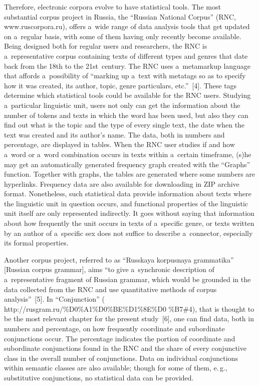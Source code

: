 \begin{multicols}{2}
  Therefore, electronic corpora evolve to have statistical tools. The most 
substantial corpus project in Russia, the ``Russian National Corpus'' (RNC, {\sf 
www.ruscorpora.ru}), offers a~wide range of data analysis tools that get updated on a~regular basis, with some of them having only recently become available. Being 
designed both for regular users and researchers, the RNC is a~representative corpus 
containing texts of different types and genres that date back from the 18th to the 
21st~century. The RNC uses a~metamarkup language that affords a~possibility of 
``marking up a~text with metatags so as to specify how it was created, its author, 
topic, genre particulars, etc.''~[4]. These tags determine which statistical tools 
could be available for the RNC users. Studying a~particular linguistic unit, 
users not only can  get the information about the number of tokens and texts in which the 
word has been used, but also they can find out what is the topic and the type of 
every single text, the date when the text was created and its author's name. The 
data, both in numbers and percentage, are displayed in tables. When the RNC user 
studies if and how a~word or a~word combination occurs in texts within a~certain 
timeframe, (s)he may get an automatically generated frequency graph created with 
the ``Graphs'' function. Together with graphs, the tables are generated where some 
numbers are hyperlinks. Frequency data are also available for downloading in ZIP 
archive format. Nonetheless, such statistical data provide information about texts 
where the linguistic unit in question occurs, and functional properties of the 
linguistic unit itself are only represented indirectly. It goes without saying that 
information about how frequently the unit occurs in texts of a~specific genre, or 
texts written by an author of a~specific sex does not suffice to describe a~connector, 
especially its formal properties.


  
  Another corpus project, referred to as ``Russkaya kor\-pus\-naya grammatika'' 
[Russian corpus grammar], aims ``to give a~synchronic description of 
a~representative fragment of Russian grammar, which would be grounded in the 
data collected from the RNC and use quantitative methods of 
corpus analysis''~[5]. In ``Conjunction'' ({\sf 
http://rusgram.ru/\%D0\%A1\%D0\%BE\%D1\%8E\%D0 \%B7\#4}), that is 
thought to be the most relevant chapter for the present study~[6], one can find data, both in 
numbers and percentage, on how frequently coordinate and subordinate 
conjunctions occur. The percentage indicates the portion of coordinate and 
subordinate conjunctions found in the RNC and the share of every conjunctive 
class in the overall number of conjunctions. Data on individual conjunctions within 
semantic classes are also available; though for some of them, e.\,g., substitutive 
conjunctions, no statistical data can be provided. 



\end{multicols}
